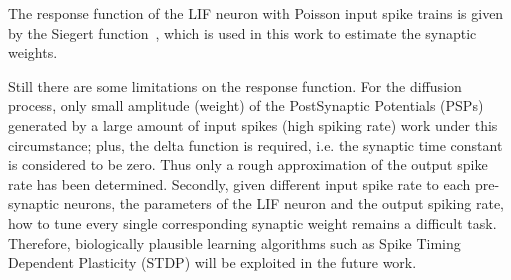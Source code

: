 \documentclass[journal]{journal}
\def\D{\mathrm{d}}
\begin{document}
The response function of the LIF neuron with Poisson input spike trains is given by the Siegert function~\cite{siegert1951first}, which is used in this work to estimate the synaptic weights. 

Still there are some limitations on the response function. 
For the diffusion process, only small amplitude (weight) of the PostSynaptic Potentials (PSPs) generated by a large amount of input spikes (high spiking rate) work under this circumstance; 
plus, the delta function is required, i.e. the synaptic time constant is considered to be zero. Thus only a rough approximation of the output spike rate has been determined.
Secondly, given different input spike rate to each pre-synaptic neurons, the parameters of the LIF neuron and the output spiking rate, how to tune every single corresponding synaptic weight remains a difficult task.
Therefore, biologically plausible learning algorithms such as Spike Timing Dependent Plasticity (STDP) will be exploited in the future work.
\end{document}
